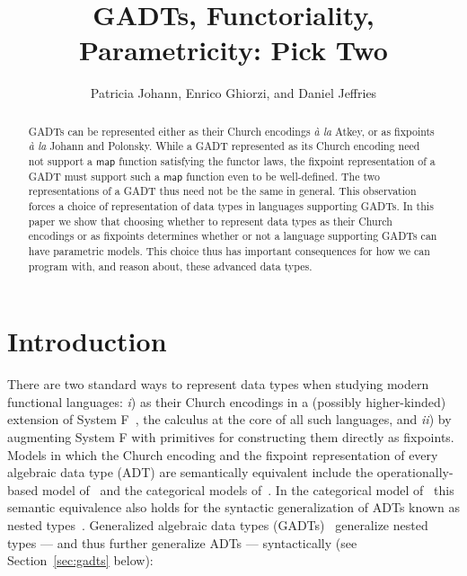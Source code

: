 \documentclass[submission,copyright,creativecommons]{eptcs}
\title{GADTs, Functoriality,  Parametricity: Pick Two}
\author{Patricia Johann, Enrico Ghiorzi, and Daniel Jeffries
\institute{Appalachian State University}
\email{johannp@appstate.edu, ghiorzie@appstate.edu,
  jeffriesd@appstate.edu}}
\begin{document}
\maketitle

\begin{abstract}
GADTs can be represented either as their Church encodings {\em \`a la}
Atkey, or as fixpoints {\em \`a la} Johann and Polonsky. While a GADT
represented as its Church encoding need not support a $\mathsf{map}$
function satisfying the functor laws, the fixpoint representation of a
GADT must support such a $\mathsf{map}$ function even to be
well-defined. The two representations of a GADT thus need not be the
same in general. This observation forces a choice of representation of
data types in languages supporting GADTs.  In this paper we show that
choosing whether to represent data types as their Church encodings or
as fixpoints determines whether or not a language supporting GADTs can
have parametric models. This choice thus has important consequences
for how we can program with, and reason about, these advanced data
types.
\end{abstract}

\maketitle

\section{Introduction}\label{sec:intro}

There are two standard ways to represent data types when studying
modern functional languages: {\em i}) as their Church encodings in a
(possibly higher-kinded) extension of System F~\cite{gir72}, the
calculus at the core of all such languages, and {\em ii}) by
augmenting System F with primitives for constructing them directly as
fixpoints.  Models in which the Church encoding and the fixpoint
representation of every algebraic data type (ADT) are semantically
equivalent include the operationally-based model of~\cite{pit98,pit00}
and the categorical models of~\cite{joh02,joh03,jgj21}.  In the
categorical model of~\cite{jgj21} this semantic equivalence also holds
for the syntactic generalization of ADTs known as nested
types~\cite{bm98}. Generalized algebraic data types
(GADTs)~\cite{pvww06} generalize nested types --- and thus further
generalize ADTs --- syntactically (see Section~\ref{sec:gadts} below):
\end{document}
